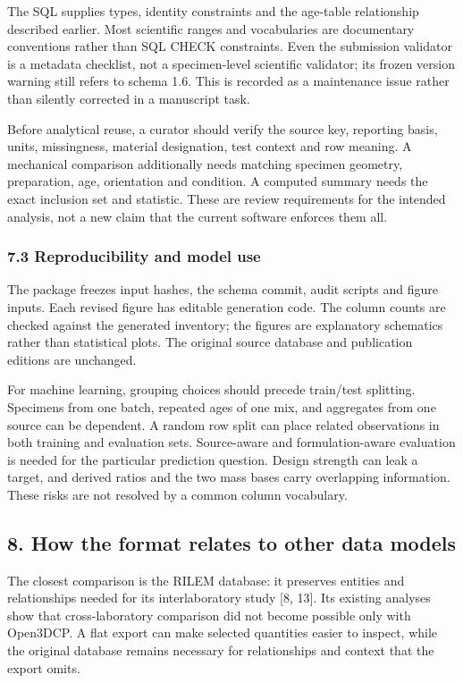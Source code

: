 \documentclass[
  american,
  11pt,
  letterpaper,
]{article}
\renewcommand{\texttt}[1]{{\ttfamily\fontsize{9.5}{11}\selectfont\hyphenchar\font=-1 #1}}
\begin{document}
The SQL supplies types, identity constraints and the age-table
relationship described earlier. Most scientific ranges and vocabularies
are documentary conventions rather than SQL \texttt{CHECK} constraints.
Even the submission validator is a metadata checklist, not a
specimen-level scientific validator; its frozen version warning still
refers to schema 1.6. This is recorded as a maintenance issue rather
than silently corrected in a manuscript task.

Before analytical reuse, a curator should verify the source key,
reporting basis, units, missingness, material designation, test context
and row meaning. A mechanical comparison additionally needs matching
specimen geometry, preparation, age, orientation and condition. A
computed summary needs the exact inclusion set and statistic. These are
review requirements for the intended analysis, not a new claim that the
current software enforces them all.

\subsubsection{7.3 Reproducibility and model
use}\label{reproducibility-and-model-use}

The package freezes input hashes, the schema commit, audit scripts and
figure inputs. Each revised figure has editable generation code. The
column counts are checked against the generated inventory; the figures
are explanatory schematics rather than statistical plots. The original
source database and publication editions are unchanged.

For machine learning, grouping choices should precede train/test
splitting. Specimens from one batch, repeated ages of one mix, and
aggregates from one source can be dependent. A random row split can
place related observations in both training and evaluation sets.
Source-aware and formulation-aware evaluation is needed for the
particular prediction question. Design strength can leak a target, and
derived ratios and the two mass bases carry overlapping information.
These risks are not resolved by a common column vocabulary.

\subsection{8. How the format relates to other data
models}\label{how-the-format-relates-to-other-data-models}

The closest comparison is the RILEM database: it preserves entities and
relationships needed for its interlaboratory study {[}8, 13{]}. Its
existing analyses show that cross-laboratory comparison did not become
possible only with Open3DCP. A flat export can make selected quantities
easier to inspect, while the original database remains necessary for
relationships and context that the export omits.
\end{document}
